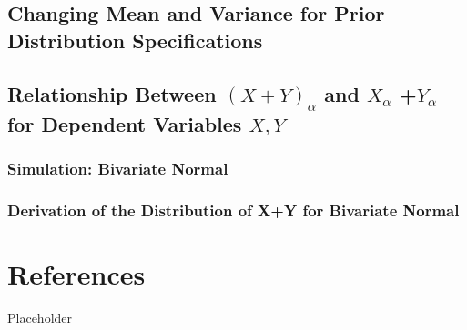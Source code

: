 \documentclass[12pt,twoside]{smiththesis}
\begin{document}
\hypertarget{changing-mean-and-variance-for-prior-distribution-specifications}{%
\section{Changing Mean and Variance for Prior Distribution Specifications}\label{changing-mean-and-variance-for-prior-distribution-specifications}}

\hypertarget{conservativeintervals}{%
\section{\texorpdfstring{Relationship Between \((X+Y)_\alpha\) and \(X_{\alpha}\) +\(Y_{\alpha}\) for Dependent Variables \(X,Y\)}{Relationship Between (X+Y)\_\textbackslash alpha and X\_\{\textbackslash alpha\} +Y\_\{\textbackslash alpha\} for Dependent Variables X,Y}}\label{conservativeintervals}}

\hypertarget{simulation-bivariate-normal}{%
\subsection{Simulation: Bivariate Normal}\label{simulation-bivariate-normal}}

\hypertarget{derivation-of-the-distribution-of-xy-for-bivariate-normal}{%
\subsection{Derivation of the Distribution of X+Y for Bivariate Normal}\label{derivation-of-the-distribution-of-xy-for-bivariate-normal}}

\hypertarget{references}{%
\chapter*{References}\label{references}}

Placeholder
\end{document}
